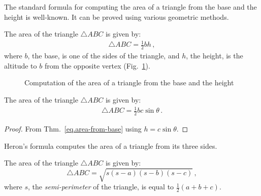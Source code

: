 The standard formula for computing the area of a triangle from the base and the height is well-known. It can be proved using various geometric methods.

\begin{theorem} The area of the triangle $\triangle ABC$ is given by:
\begin{align}
\triangle ABC=\frac{1}{2}bh\,,\label{eq.area-from-base}
\end{align}
where $b$, the base, is one of the sides of the triangle, and $h$, the height, is the altitude to $b$ from the opposite vertex (Fig.~\ref{f.area-base-height}).
\end{theorem}

\begin{figure}[t]
\begin{center}
\end{center}
\caption{Computation of the area of a triangle from the base and the height}\label{f.area-base-height}
\end{figure}

\newpage

\begin{theorem} The area of the triangle $\triangle ABC$ is given by:
\begin{align}\label{eq.area-from-sine}
\triangle ABC = \frac{1}{2}bc\sin \theta\,.
\end{align}
\end{theorem}
\begin{proof} From Thm.~\ref{eq.area-from-base} using
$h=c\sin \theta$.
\end{proof}



Heron's formula computes the area of a triangle from its three sides.
\begin{theorem}[Heron] The area of the triangle $\triangle ABC$ is given by:\label{thm.heron} 
\[
\triangle ABC = \sqrt{s(s-a)(s-b)(s-c)}\,,
\]
where $s$, the \emph{semi-perimeter} of the triangle, is equal to  $\frac{1}{2}(a+b+c)$.
\end{theorem}

